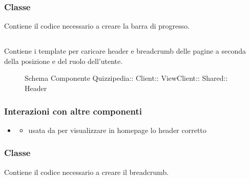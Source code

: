 \subsubsection{Classe }
Contiene il codice necessario a creare la barra di progresso.
\subsection{}
Contiene i template per caricare header e breadcrumb delle pagine a seconda della posizione e del ruolo dell'utente.
\begin{figure}[H]
\centering
\noindent{}
\caption[Schema Componente Header]{Schema Componente Quizzipedia:: Client:: ViewClient:: Shared:: Header}
\end{figure}
\subsubsection{Interazioni con altre componenti}
\begin{itemize}
\item {}
\begin{itemize}
\item usata da  per visualizzare in homepage lo header corretto
\end{itemize}
\end{itemize}
\subsubsection{Classe }
Contiene il codice necessario a creare il breadcrumb.
